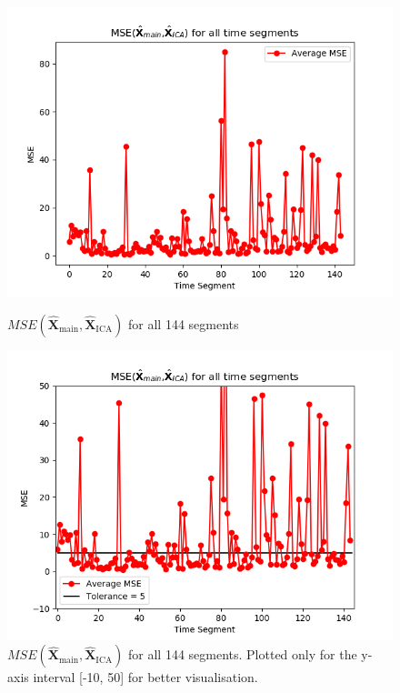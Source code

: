\begin{figure}[H]
\begin{widepage}
    \begin{minipage}[t]{.45\textwidth}
		\centering
		\includegraphics[width=1\linewidth]{figures/ch_7/average_mse_third_removed_ica}
	\caption{$MSE\left(\hat{\mathbf{X}}_{\text{main}},\hat{\mathbf{X}}_{\text{ICA}}\right)$ for all 144 segments}
	\label{fig:M<N_1}
    \end{minipage} 
\hspace{0.5cm}
    \begin{minipage}[t]{.45\textwidth}
        \centering
		\includegraphics[width=1\linewidth]{figures/ch_7/average_mse_third_removed_ica_zoom.png}
	\caption{$MSE\left(\hat{\mathbf{X}}_{\text{main}},\hat{\mathbf{X}}_{\text{ICA}}\right)$ for all 144 segments. Plotted only for the y-axis interval [-10, 50] for better visualisation.}
	\label{fig:M<N_1_2}
    \end{minipage}
\end{widepage}
\end{figure}

